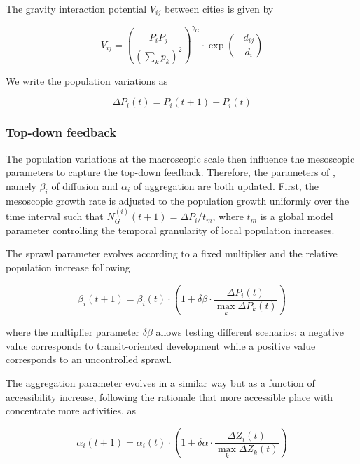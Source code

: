 \documentclass[referee,lineno,pdflatex,sn-apa]{sn-jnl}
\begin{document}
The gravity interaction potential $V_{ij}$ between cities is given by 
	
\begin{equation}
	\label{eq:eq2}
		V_{ij} = \left(\frac{P_i P_j}{(\sum_k p_k)^2}\right)^{\gamma_G} \cdot \exp \left(- \frac{d_{ij}}{d_i} \right)
\end{equation}

We write the population variations as
	
\begin{equation}
	\label{eq:eq3}
	\Delta P_i (t) = P_i (t + 1) - P_i (t)
\end{equation}

	
\subsubsection{Top-down feedback}

The population variations at the macroscopic scale then influence the mesoscopic parameters to capture the top-down feedback. Therefore, the parameters of \cite{raimbault2018calibration}, namely $\beta_i$ of diffusion and $\alpha_i$ of aggregation are both updated. First, the mesoscopic growth rate is adjusted to the population growth uniformly over the time interval such that $N_G^{(i)} (t + 1) = \Delta P_i / t_m$, where $t_m$ is a global model parameter controlling the temporal granularity of local population increases.			
			
The sprawl parameter evolves according to a fixed multiplier and the relative population increase following 

			\begin{equation}
			\label{eq:eq4}
				\beta_i (t+1) = \beta_i (t) \cdot \left(1 + \delta\beta \cdot \frac{\Delta P_i (t)}{\max_k  \Delta P_k (t)}\right)
			\end{equation}
			
where the multiplier parameter $\delta\beta$ allows testing different scenarios: a negative value corresponds to transit-oriented development while a positive value corresponds to an uncontrolled sprawl.
			
The aggregation parameter evolves in a similar way but as a function of accessibility increase, following the rationale that more accessible place with concentrate more activities, as
 
\begin{equation}
	\label{eq:eq5}
	\alpha_i (t+1) = \alpha_i (t) \cdot \left(1 + \delta\alpha \cdot \frac{\Delta Z_i (t)}{\max_k  \Delta Z_k (t)}\right)
\end{equation}
			
\end{document}
